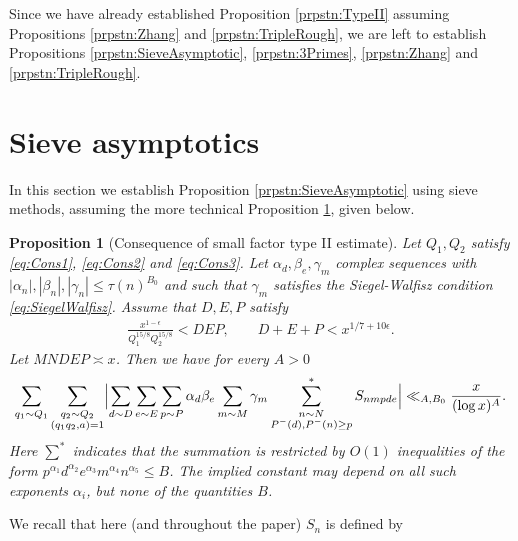 \documentclass[10pt]{amsart}
\theoremstyle{plain}
\newtheorem{prpstn}[thrm]{Proposition}
\numberwithin{equation}{section}
\begin{document}
%
%
%
%
%
%
%
%
Since we have already established Proposition \ref{prpstn:TypeII} assuming Propositions \ref{prpstn:Zhang} and \ref{prpstn:TripleRough}, we are left to establish Propositions \ref{prpstn:SieveAsymptotic}, \ref{prpstn:3Primes}, \ref{prpstn:Zhang} and \ref{prpstn:TripleRough}.
%
%
%
%
%
%
%
%
%
%
%
%
%
%
%
%
%
%
\section{Sieve asymptotics}\label{sec:Asymptotic}
%
%
%
%
In this section we establish Proposition \ref{prpstn:SieveAsymptotic} using sieve methods, assuming the more technical Proposition \ref{prpstn:VBounds}, given below.
%
%
%
%
%
%
%
%
\begin{prpstn}[Consequence of small factor type II estimate]\label{prpstn:VBounds}
Let $Q_1,Q_2$ satisfy \eqref{eq:Cons1}, \eqref{eq:Cons2} and \eqref{eq:Cons3}. Let $\alpha_d,\beta_e,\gamma_m$ complex sequences with $|\alpha_n|,|\beta_n|,|\gamma_n|\le \tau(n)^{B_0}$ and such that $\gamma_m$ satisfies the Siegel-Walfisz condition \eqref{eq:SiegelWalfisz}. Assume that $D,E,P$ satisfy
\begin{align*}
\frac{x^{1-\epsilon} }{Q_1^{15/8} Q_2^{15/8} }<D E P,\qquad D+E+P<x^{1/7+10\epsilon}.
\end{align*}
Let $M N D E P\asymp x$. Then we have for every $A>0$
\[
\sum_{q_1\sim Q_1}\sum_{\substack{q_2\sim Q_2\\ (q_1q_2,a)=1}}\Bigl|\sum_{d\sim D}\sum_{e\sim E}\sum_{p\sim P}\alpha_{d}\beta_e\sum_{m\sim M}\gamma_m \sum^*_{\substack{n\sim N\\ P^-(d),P^-(n)\ge p}}S_{n m p d e}\Bigr|\ll_{A,B_0} \frac{x}{(\log{x})^A}.
\]
Here $\sum^*$ indicates that the summation is restricted by $O(1)$ inequalities of the form $p^{\alpha_1}d^{\alpha_2}e^{\alpha_3}m^{\alpha_4}n^{\alpha_5}\le B$. The implied constant may depend on all such exponents $\alpha_i$, but none of the quantities $B$.
\end{prpstn}
%
%
%
%
%
%
%
%
We recall that here (and throughout the paper) $S_n$ is defined by
\end{document}
